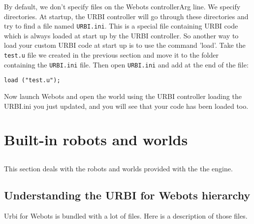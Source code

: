 By default, we don't specify files on the Webots controllerArg
line. We specify directories.  At startup, the URBI controller will go
through these directories and try to find a file named
\nolinkurl{URBI.ini}. This is a special file containing URBI code
which is always loaded at start up by the URBI controller. So another
way to load your custom URBI code at start up is to use the command
'load'.  Take the \nolinkurl{test.u} file we created in the previous
section and move it to the folder containing the \nolinkurl{URBI.ini}
file. Then open \nolinkurl{URBI.ini} and add at the end of the file:


\begin{lstlisting}[firstnumber=1,]
      load ("test.u");
\end{lstlisting}
Now launch Webots and open the world using the URBI controller loading
the URBI.ini you just updated, and you will see that your code has
been loaded too.


\section{Built-{}in robots and worlds}
\label{webots.builtin}%

\subsection{}\label{webots.builtin.intro}%

 This section deals with the robots and worlds provided with the
the engine.


\subsection{Understanding the URBI for Webots hierarchy}
\label{webots.builtin.hierarchy}%

 Urbi for Webots is bundled with a lot of files. Here is a description of
those files.

